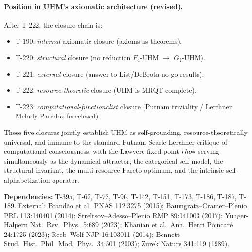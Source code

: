 \paragraph{Position in UHM's axiomatic architecture (revised).}
After T-222, the closure chain is:
\begin{itemize}[leftmargin=2em,nosep]
  \item T-190: \emph{internal} axiomatic closure (axioms as
        theorems).
  \item T-220: \emph{structural} closure (no reduction
        $F_4$-UHM $\to$ $G_2$-UHM).
  \item T-221: \emph{external} closure (answer to List/DeBrota
        no-go results).
  \item T-222: \emph{resource-theoretic} closure (UHM is
        MRQT-complete).
  \item T-223: \emph{computational-functionalist} closure
        (Putnam triviality / Lerchner Melody-Paradox foreclosed).
\end{itemize}
These five closures jointly establish UHM as self-grounding,
resource-theoretically universal, and immune to the standard
Putnam-Searle-Lerchner critique of computational consciousness,
with the Lawvere fixed point $rho*$ serving simultaneously as
the dynamical attractor, the categorical self-model, the
structural invariant, the multi-resource Pareto-optimum, and the
intrinsic self-alphabetization operator.

\textbf{Dependencies:} T-39a, T-62, T-73, T-96, T-142, T-151,
T-173, T-186, T-187, T-189. External: Brand\~ao et al.\ PNAS
112:3275 (2015); Baumgratz--Cramer--Plenio PRL 113:140401 (2014);
Streltsov--Adesso--Plenio RMP 89:041003 (2017); Yunger-Halpern
Nat.\ Rev.\ Phys.\ 5:689 (2023); Khanian et al.\ Ann.\ Henri
Poincar\'e 24:1725 (2023); Reeb--Wolf NJP 16:103011 (2014);
Bennett Stud.\ Hist.\ Phil.\ Mod.\ Phys.\ 34:501 (2003); Zurek
Nature 341:119 (1989).


